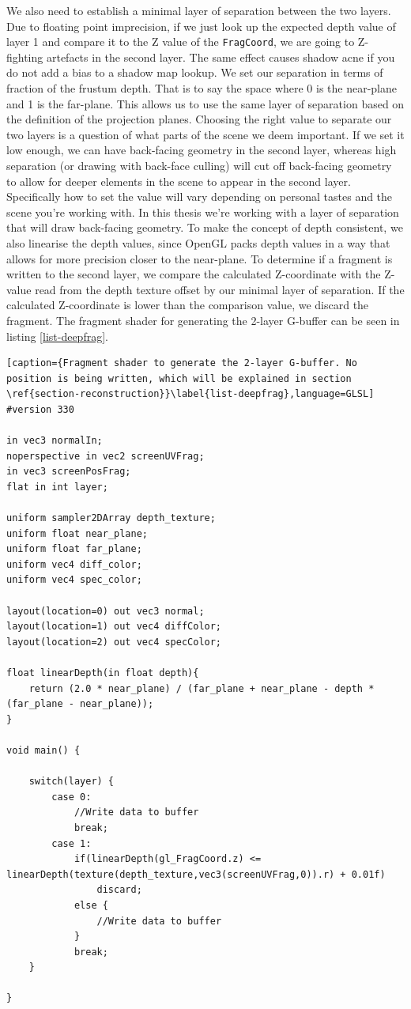 We also need to establish a minimal layer of separation between the two layers. Due to floating point imprecision, if we just look up the expected depth value of layer 1 and compare it to the Z value of the \verb=FragCoord=, we are going to Z-fighting artefacts in the second layer. The same effect causes shadow acne if you do not add a bias to a shadow map lookup. We set our separation in terms of fraction of the frustum depth. That is to say the space where 0 is the near-plane and 1 is the far-plane. This allows us to use the same layer of separation based on the definition of the projection planes. Choosing the right value to separate our two layers is a question of what parts of the scene we deem important. If we set it low enough, we can have back-facing geometry in the second layer, whereas high separation (or drawing with back-face culling) will cut off back-facing geometry to allow for deeper elements in the scene to appear in the second layer. Specifically how to set the value will vary depending on personal tastes and the scene you're working with. In this thesis we're working with a layer of separation that will draw back-facing geometry. To make the concept of depth consistent, we also linearise the depth values, since OpenGL packs depth values in a way that allows for more precision closer to the near-plane. To determine if a fragment is written to the second layer, we compare the calculated Z-coordinate with the Z-value read from the depth texture offset by our minimal layer of separation. If the calculated Z-coordinate is lower than the comparison value, we discard the fragment. The fragment shader for generating the 2-layer G-buffer can be seen in listing \ref{list-deepfrag}.

\begin{lstlisting}[caption={Fragment shader to generate the 2-layer G-buffer. No position is being written, which will be explained in section \ref{section-reconstruction}}\label{list-deepfrag},language=GLSL]
#version 330

in vec3 normalIn;
noperspective in vec2 screenUVFrag;
in vec3 screenPosFrag;
flat in int layer;

uniform sampler2DArray depth_texture;
uniform float near_plane;
uniform float far_plane;
uniform vec4 diff_color;
uniform vec4 spec_color;

layout(location=0) out vec3 normal;
layout(location=1) out vec4 diffColor;
layout(location=2) out vec4 specColor;

float linearDepth(in float depth){
	return (2.0 * near_plane) / (far_plane + near_plane - depth * (far_plane - near_plane));
}

void main() {

	switch(layer) {
		case 0:
			//Write data to buffer
			break;
		case 1:
			if(linearDepth(gl_FragCoord.z) <= linearDepth(texture(depth_texture,vec3(screenUVFrag,0)).r) + 0.01f)
				discard;
			else {
				//Write data to buffer
			}
			break;
	}

}
\end{lstlisting}

